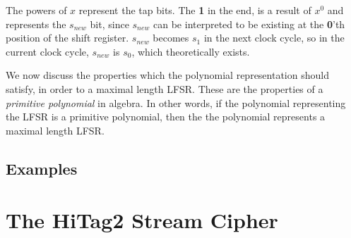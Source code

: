 The powers of $x$ represent the tap bits. The \textbf{1} in the end, is a result of $x^0$ and represents the $s_{new}$ bit, since $s_{new}$ can be interpreted to be existing at the \textbf{0}'th position of the shift register. $s_{new}$ becomes $s_1$ in the next clock cycle, so in the current clock cycle, $s_{new}$ is $s_0$, which theoretically exists.

We now discuss the properties which the polynomial representation should satisfy, in order to  a maximal length LFSR. These are the properties of a \textit{primitive polynomial} in algebra. In other words, if the polynomial representing the LFSR is a primitive polynomial, then the the polynomial represents a maximal length LFSR. 


\subsection{Examples}

\section{The HiTag2 Stream Cipher}



